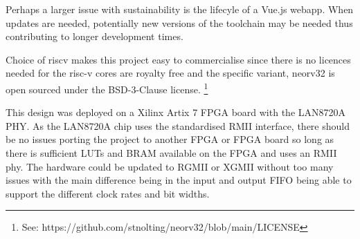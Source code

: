 Perhaps a larger issue with sustainability is the lifecyle of a Vue.js webapp. When updates are needed, potentially new versions of the toolchain may be needed thus contributing to longer development times. 

Choice of riscv makes this project easy to commercialise since there is no licences needed for the risc-v cores are royalty free and the specific variant, neorv32 is open sourced under the BSD-3-Clause license. \footnote[1]{See: https://github.com/stnolting/neorv32/blob/main/LICENSE}

This design was deployed on a Xilinx Artix 7 FPGA board with the LAN8720A PHY. As the LAN8720A chip uses the standardised RMII interface, there should be no issues porting the project to another FPGA or FPGA board so long as there is sufficient LUTs and BRAM available on the FPGA and uses an RMII phy. The hardware could be updated to RGMII or XGMII without too many issues with the main difference being in the input and output FIFO being able to support the different clock rates and bit widths. 